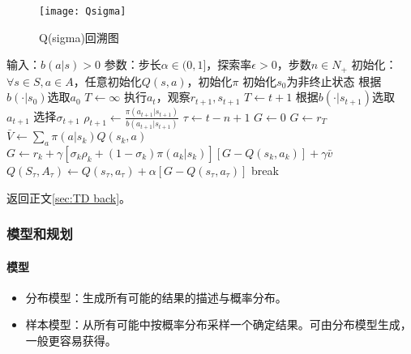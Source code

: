 \documentclass[
12pt, %
a4paper, 
oneside, %
headinclude,footinclude, %
]{scrartcl}
\begin{document}
\begin{figure}[H]
\centering
\texttt{[image: Qsigma]}
\caption{Q(sigma)回溯图}
\end{figure}
\begin{myalgorithm}
\State 输入：$ b(a|s) > 0 $
\State 参数：步长$ \alpha \in (0,1] $，探索率$ \epsilon > 0 $，步数$ n \in N_+ $
\State 初始化：$ \forall s \in S, a \in A $，任意初始化$ Q(s, a) $，初始化$ \pi $
\State 初始化$ s_0 $为非终止状态
\State 根据$ b(\cdot|s_0) $选取$ a_0 $
\State $ T \gets \infty $
\State 执行$ a_t $，观察$ r_{t + 1}, s_{t + 1} $
\State $ T \gets t + 1 $
\Else
\State 根据$ b(\cdot|s_{t + 1}) $选取$ a_{t + 1} $
\State 选择$ \sigma_{t + 1} $ 
\State $ \rho_{t + 1} \gets \frac{\pi(a_{t + 1}|s_{t + 1})}{b(a_{t + 1}|s_{t + 1})}$ 
\EndIf
\EndIf
\State $ \tau \gets t - n + 1 $ 
\State $ G \gets 0 $
\State $ G \gets r_T $
\Else
\State $ \bar{V} \gets \sum_a \pi(a|s_k)Q(s_k, a) $ 
\State $ G \gets r_k + \gamma[\sigma_k \rho_k + (1 - \sigma_k)\pi(a_k|s_k)][G - Q(s_k, a_k)] + \gamma\bar{v} $
\EndIf
\EndFor
\State $ Q(S_{\tau},A_{\tau}) \gets Q(s_{\tau}, a_{\tau}) + \alpha[G - Q(s_{\tau}, a_{\tau})] $
\EndIf
{}
\State break
\EndIf
\EndFor
\EndFor
\end{myalgorithm}

返回正文\ref{sec:TD back}。
\subsubsection[模型和规划]{模型和规划}\label{sec:table}
\paragraph{模型}
\begin{itemize}
\item 分布模型：生成所有可能的结果的描述与概率分布。
\item 样本模型：从所有可能中按概率分布采样一个确定结果。可由分布模型生成，一般更容易获得。
\end{itemize}
\end{document}

